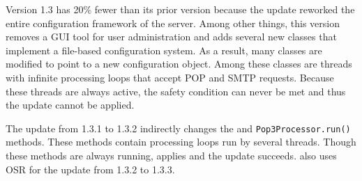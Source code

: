 Version 1.3 has 20\% fewer \SLOC than its prior version because the update
reworked the entire
configuration framework of the server. Among other things, this version
removes a GUI tool for user administration and adds several new classes
that implement a file-based configuration system. As a result, many
classes are modified to point to a new configuration object.  Among these
classes are threads with infinite processing loops that accept POP and SMTP
requests.  Because these threads are always active, the safety condition
can never be met and thus the update cannot be applied.

The update from 1.3.1 to 1.3.2 indirectly changes the
\SMTPSenderrun
and \texttt{Pop3Processor.run()} methods.  These
methods contain processing loops run by several threads.  Though these
methods are always running, \JV applies \OSR and the update succeeds.  \JV
also uses OSR for the update from 1.3.2 to 1.3.3.
